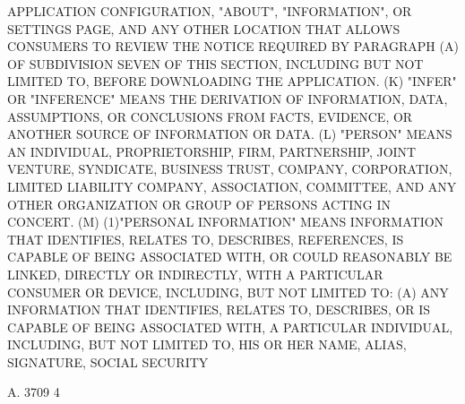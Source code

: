  APPLICATION CONFIGURATION, "ABOUT", "INFORMATION", OR SETTINGS PAGE, AND
 ANY OTHER LOCATION THAT ALLOWS CONSUMERS TO REVIEW THE  NOTICE  REQUIRED
 BY PARAGRAPH (A) OF SUBDIVISION SEVEN OF THIS SECTION, INCLUDING BUT NOT
 LIMITED TO, BEFORE DOWNLOADING THE APPLICATION.
   (K)  "INFER" OR "INFERENCE" MEANS THE DERIVATION OF INFORMATION, DATA,
 ASSUMPTIONS, OR CONCLUSIONS FROM FACTS, EVIDENCE, OR ANOTHER  SOURCE  OF
 INFORMATION OR DATA.
   (L)  "PERSON"  MEANS AN INDIVIDUAL, PROPRIETORSHIP, FIRM, PARTNERSHIP,
 JOINT VENTURE, SYNDICATE, BUSINESS TRUST, COMPANY, CORPORATION,  LIMITED
 LIABILITY COMPANY, ASSOCIATION, COMMITTEE, AND ANY OTHER ORGANIZATION OR
 GROUP OF PERSONS ACTING IN CONCERT.
   (M)  (1)"PERSONAL  INFORMATION"  MEANS  INFORMATION  THAT  IDENTIFIES,
 RELATES TO, DESCRIBES, REFERENCES, IS CAPABLE OF BEING ASSOCIATED  WITH,
 OR COULD REASONABLY BE LINKED, DIRECTLY OR INDIRECTLY, WITH A PARTICULAR
 CONSUMER OR DEVICE, INCLUDING, BUT NOT LIMITED TO:
   (A)  ANY  INFORMATION  THAT  IDENTIFIES,  RELATES TO, DESCRIBES, OR IS
 CAPABLE OF BEING ASSOCIATED WITH, A  PARTICULAR  INDIVIDUAL,  INCLUDING,
 BUT  NOT  LIMITED TO, HIS OR HER NAME, ALIAS, SIGNATURE, SOCIAL SECURITY

 A. 3709                             4
 
